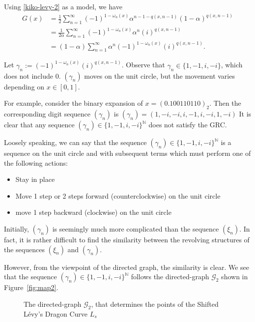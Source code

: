 \documentclass[epsf,10pt]{article}
\newcommand\GG{\mathcal{G}}
\begin{document}
Using \eqref{kiko-levy-2} as a model, we have 
\begin{align*}
    G(x) &= \frac{1}{2} \sum^\infty_{n=1} (-1)^{1-\omega_n(x)} \alpha^{n-1-q(x,n-1)}(1-\alpha)^{q(x,n-1)} \\
    &=\frac{1}{2\alpha}\sum^\infty_{n=1} (-1)^{1-\omega_n(x)} \alpha^{n}(i)^{q(x,n-1)} \\
    &=(1-\alpha)\sum^\infty_{n=1} \alpha^n (-1)^{1-\omega_n(x)}(i)^{q(x,n-1)}. 
    \end{align*}
    
Let $\gamma_n:=(-1)^{1-\omega_n(x)}(i)^{q(x,n-1)}$. Observe that $\gamma_n \in \{1,-1, i,-i\}$, which does not include $0$. $(\gamma_n)$ moves on the unit circle, but the movement varies depending on $x \in [0,1]$.

For example, consider the binary expansion of $x=(0.100110110)_2$. Then the corresponding digit sequence $(\gamma_n)$ is 
$(\gamma_n)=(1, -i, -i, i, -1, i, -i, 1, -i)$
It is clear that any sequence $(\gamma_n) \in \{1,-1, i,-i\}^{\mathbb{N}}$ does not satisfy the GRC. 

Loosely speaking, we can say that the sequence $(\gamma_n)\in \{1,-1, i,-i\}^{\mathbb{N}}$ is a sequence on the unit circle and with subsequent terms which must perform one of the following actions:  
\begin{itemize}
\item Stay in place 
\item Move 1 step or 2 steps forward (counterclockwise) on the unit circle
\item move 1 step backward (clockwise) on the unit circle
\end{itemize}

Initially, $(\gamma_n)$ is seemingly much more complicated than the sequence $(\xi_n)$. In fact, it is rather difficult to find the similarity between the revolving structures of the sequences $(\xi_n)$ and  $(\gamma_n)$. 

However, from the viewpoint of the directed graph, the similarity is clear. We see that the sequence $(\gamma_n)\in \{1,-1, i,-i\}^{\mathbb{N}}$ follows the directed-graph $\GG_2$ shown in Figure~\eqref{fig:map2}.

\begin{figure}[H]
  	\begin{center}
	\end{center}
    \caption{The directed-graph $\GG_2$, that determines the points of the Shifted L\'evy's Dragon Curve $L_s$}
\label{fig:map2}
\end{figure}
\end{document}

